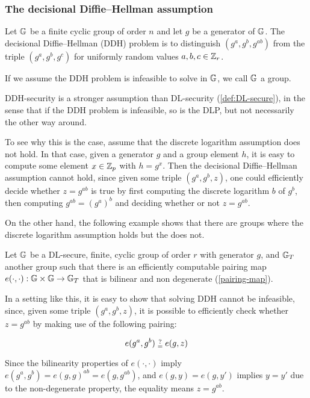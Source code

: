 \subsubsection{The decisional Diffie--Hellman assumption}
\label{def:DDH-secure}

\begin{definition}
Let $\mathbb{G}$ be a finite cyclic group of order $n$ and let $g$ be a generator of $\mathbb{G}$. The decisional Diffie--Hellman (DDH) problem is to distinguish $(g^a,g^b, g^{ab})$ from the triple $(g^a,g^b,g^c)$ for uniformly random values $a,b,c\in \mathbb{Z}_r$. 
\end{definition}

If we assume the DDH problem is infeasible to solve in $\mathbb{G}$, we call $\mathbb{G}$ a  group.

DDH-security is a stronger assumption than DL-security (\ref{def:DL-secure}), in the sense that if the DDH problem is infeasible, so is the DLP, but not necessarily the other way around.

To see why this is the case, assume that the discrete logarithm assumption does not hold. In that case, given a generator $g$ and a group element $h$, it is easy to compute some element $x\in\mathbb{Z}_p$ with $h=g^x$. Then the decisional Diffie--Hellman assumption cannot hold, since given some triple $(g^a , g^b , z )$, one could efficiently decide whether $z = g^{ab}$ is true by first computing the discrete logarithm $b$ of  $g^b$, then computing $g^{ab}= (g^a)^b$ and deciding whether or not $z=g^{ab}$.

On the other hand, the following example shows that there are groups where the discrete logarithm assumption holds but the  does not.

\begin{example}

Let $\mathbb{G}$ be a DL-secure, finite, cyclic group of order $r$ with generator $g$, and $\mathbb{G}_T$ another group such that there is an efficiently computable pairing map $e(\cdot,\cdot): \mathbb{G} \times \mathbb{G} \to \mathbb{G}_T$ that is bilinear and non degenerate (\ref{pairing-map}).

In a setting like this, it is easy to show that solving DDH cannot be infeasible, since, given some  triple $(g^a, g^b, z)$, it is possible to efficiently check whether $z = g^{ab}$ by making use of the following pairing:

\begin{equation}
e(g^a,g^b) \checkeq e(g,z)
\end{equation}

Since the bilinearity properties of $e(\cdot,\cdot)$ imply $e(g^a,g^b)= e(g,g)^{ab}= e(g,g^{ab})$, and $e(g,y)=e(g,y')$ implies $y=y'$ due to the non-degenerate property, the equality means $z=g^{ab}$.

\end{example}

